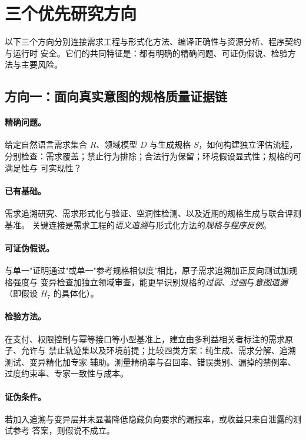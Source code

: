 \section{三个优先研究方向}

以下三个方向分别连接需求工程与形式化方法、编译正确性与资源分析、程序契约与运行时
安全。它们的共同特征是：都有明确的精确问题、可证伪假说、检验方法与主要风险。

\subsection*{方向一：面向真实意图的规格质量证据链}

\paragraph{精确问题。}
给定自然语言需求集合 $R$、领域模型 $D$ 与生成规格 $S$，如何构建独立评估流程，
分别检查：需求覆盖；禁止行为排除；合法行为保留；环境假设显式性；规格的可满足性与
可实现性？

\paragraph{已有基础。}
需求追溯研究、需求形式化与验证、空洞性检测、以及近期的规格生成与联合评测基准。
关键连接是需求工程的\emph{语义追溯}与形式化方法的\emph{规格与程序反例}。

\paragraph{可证伪假说。}
与单一"证明通过"或单一"参考规格相似度"相比，原子需求追溯加正反向测试加规格强度与
变异检查加独立领域审查，能更早识别规格的\emph{过弱}、\emph{过强}与\emph{意图遗漏}
（即假设 $H_7$ 的具体化）。

\paragraph{检验方法。}
在支付、权限控制与幂等接口等小型基准上，建立由多利益相关者标注的需求原子、允许与
禁止轨迹集以及环境前提；比较四类方案：纯生成、需求分解、追溯测试、变异精化加专家
辅助。测量精确率与召回率、错误类别、漏掉的禁例率、过度约束率、专家一致性与成本。

\paragraph{证伪条件。}
若加入追溯与变异层并未显著降低隐藏负向要求的漏报率，或收益只来自泄露的测试参考
答案，则假说不成立。

